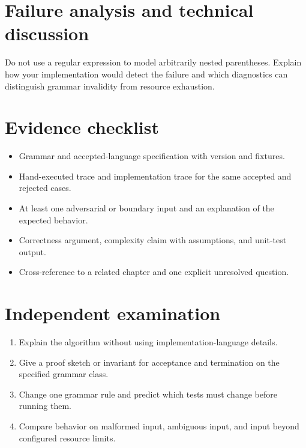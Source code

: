 \documentclass[11pt,letterpaper]{article}
\begin{document}
\section{Failure analysis and technical discussion}
Do not use a regular expression to model arbitrarily nested parentheses. Explain how your implementation would detect the failure and which diagnostics can distinguish grammar invalidity from resource exhaustion.
\section{Evidence checklist}
\begin{itemize}
\item Grammar and accepted-language specification with version and fixtures.
\item Hand-executed trace and implementation trace for the same accepted and rejected cases.
\item At least one adversarial or boundary input and an explanation of the expected behavior.
\item Correctness argument, complexity claim with assumptions, and unit-test output.
\item Cross-reference to a related chapter and one explicit unresolved question.
\end{itemize}
\section{Independent examination}
\begin{enumerate}
\item Explain the algorithm without using implementation-language details.
\item Give a proof sketch or invariant for acceptance and termination on the specified grammar class.
\item Change one grammar rule and predict which tests must change before running them.
\item Compare behavior on malformed input, ambiguous input, and input beyond configured resource limits.
\end{enumerate}
\end{document}
